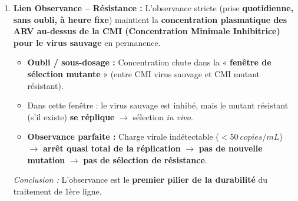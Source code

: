 \documentclass[11pt]{article}
\begin{document}
\begin{corrige}
\begin{enumerate}
\begin{itemize}
\item \textbf{Résistance croisée totale :} K103N confère une résistance de haut niveau à \textbf{tous les INNTI de 1ère génération} (EFV, NVP). La rilpivirine (RPV, 2ème gen) conserve une activité partielle mais n'est pas recommandée en cas d'échec sur EFV sans test de résistance.
\item \textbf{Augmentation de dose inefficace :} La résistance est due à une \textbf{perte d'affinité} (liaison), pas à une concentration insuffisante. Augmenter la dose ne restaure pas la liaison (plafonnement de l'effet) et augmente la \textbf{toxicité} (neuropsychiatrique pour EFV, hépatique/cutanée pour NVP).
\item \textbf{Stratégie 2ème ligne (OMS/Cameroun) :} Passer à un schéma à \textbf{barrière génétique élevée} sans résistance croisée : \textbf{INI (Dolutégravir DTG) + 2 INTI (TDF + 3TC ou TAF + FTC)}. L'INI (DTG) a une barrière génétique très haute (mutations multiples nécessaires) et aucune résistance croisée avec les INNTI/INTI.
\end{itemize}
\item \textbf{Lien Observance -- Résistance :}
L'observance stricte (prise \textbf{quotidienne, sans oubli, à heure fixe}) maintient la \textbf{concentration plasmatique des ARV au-dessus de la CMI (Concentration Minimale Inhibitrice) pour le virus sauvage} en permanence.
\begin{itemize}
\item \textbf{Oubli / sous-dosage :} Concentration chute dans la « \textbf{fenêtre de sélection mutante} » (entre CMI virus sauvage et CMI mutant résistant).
\item Dans cette fenêtre : le virus sauvage est inhibé, mais le mutant résistant (s'il existe) \textbf{se réplique} $\to$ sélection \emph{in vivo}.
\item \textbf{Observance parfaite :} Charge virale indétectable ($< \SI{50}{copies/mL}$) $\to$ \textbf{arrêt quasi total de la réplication} $\to$ \textbf{pas de nouvelle mutation} $\to$ \textbf{pas de sélection de résistance}.
\end{itemize}
\emph{Conclusion :} L'observance est le \textbf{premier pilier de la durabilité} du traitement de 1ère ligne.
\end{enumerate}


\end{corrige}
\end{document}

